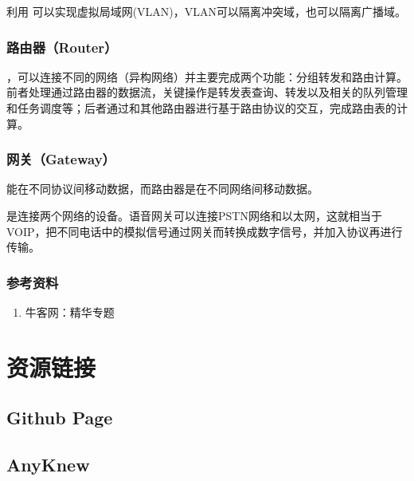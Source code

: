 \documentclass[letterpaper,10pt,english]{sphinxmanual}
\begin{document}
利用  可以实现虚拟局域网(VLAN)，VLAN可以隔离冲突域，也可以隔离广播域。


\subsection{路由器（Router）}
\label{\detokenize{computerNetwork/03_router:router}}
 ，可以连接不同的网络（异构网络）并主要完成两个功能：分组转发和路由计算。
前者处理通过路由器的数据流，关键操作是转发表查询、转发以及相关的队列管理和任务调度等；后者通过和其他路由器进行基于路由协议的交互，完成路由表的计算。


\subsection{网关（Gateway）}
\label{\detokenize{computerNetwork/03_router:gateway}}
 能在不同协议间移动数据，而路由器是在不同网络间移动数据。

 是连接两个网络的设备。语音网关可以连接PSTN网络和以太网，这就相当于VOIP，把不同电话中的模拟信号通过网关而转换成数字信号，并加入协议再进行传输。


\subsection{参考资料}
\label{\detokenize{computerNetwork/03_router:id2}}\begin{enumerate}
\item {} 
牛客网：精华专题

\end{enumerate}
\begin{quote}

\end{quote}


\chapter{资源链接}
\label{\detokenize{link/index::doc}}\label{\detokenize{link/index:id1}}

\section{Github Page}
\label{\detokenize{link/index:github-page}}


\section{AnyKnew}
\label{\detokenize{link/index:anyknew}}
\end{document}
